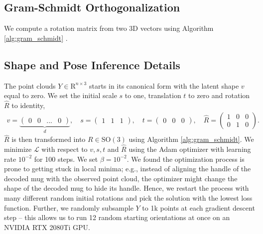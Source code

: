 \documentclass{article}
\begin{document}




\subsection{Gram-Schmidt Orthogonalization}

We compute a rotation matrix from two 3D vectors using Algorithm \ref{alg:gram_schmidt} \cite{park22learning}.



\subsection{Shape and Pose Inference Details}
\label{appendix:method:inference}

The point clouds $Y \in \mathrm{R}^{n \times 3}$ starts in its canonical form with the latent shape $v$ equal to zero. We set the initial scale $s$ to one, translation $t$ to zero and rotation $\hat{R}$ to identity,
\begin{align}
    v = \underbrace{\begin{pmatrix} 0 & 0 & ... & 0 \end{pmatrix}}_d,\quad s = \begin{pmatrix} 1 & 1 & 1 \end{pmatrix},\quad t = \begin{pmatrix} 0 & 0 & 0 \end{pmatrix},\quad \hat{R} = \begin{pmatrix} 1 & 0 & 0 \\ 0 & 1 & 0 \end{pmatrix}.
\end{align}
$\hat{R}$ is then transformed into $R \in \mathrm{SO}(3)$ using Algorithm \ref{alg:gram_schmidt}. We minimize $\mathcal{L}$ with respect to $v, s, t$ and $\hat{R}$ using the Adam optimizer \cite{kingma17adam} with learning rate $10^{-2}$ for 100 steps. We set $\beta=10^{-2}$. We found the optimization process is prone to getting stuck in local minima; e.g., instead of aligning the handle of the decoded mug with the observed point cloud, the optimizer might change the shape of the decoded mug to hide its handle. Hence, we restart the process with many different random initial rotations and pick the solution with the lowest loss function. Further, we randomly subsample $Y$ to 1k points at each gradient descent step -- this allows us to run 12 random starting orientations at once on an NVIDIA RTX 2080Ti GPU.
\end{document}

